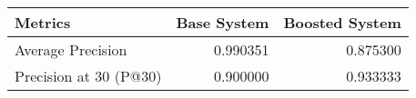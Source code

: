 \begin{tabular}{lrr}
\toprule
               Metrics &  Base System &  Boosted System \\
\midrule
     Average Precision &     0.990351 &        0.875300 \\
Precision at 30 (P@30) &     0.900000 &        0.933333 \\
\bottomrule
\end{tabular}
